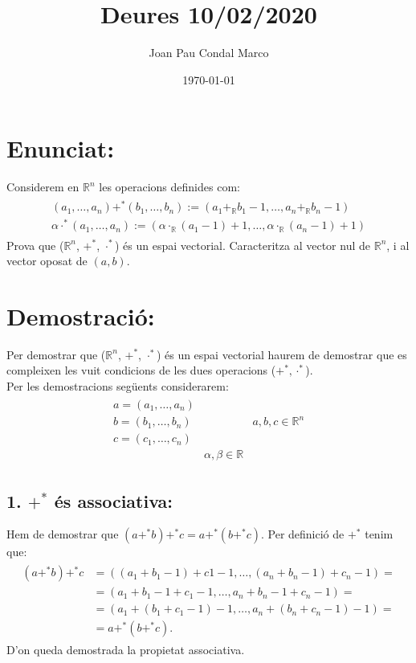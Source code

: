 \documentclass[a4paper, 9pt]{article}
\title{Deures 10/02/2020}
\author{Joan Pau Condal Marco}
\date{\today}
\begin{document}
    \maketitle
    \justify
    \section*{Enunciat:}

    Considerem en ${\mathbb{R}^n}$ les operacions definides com:
    \begin{align*}
        \begin{aligned}
            (a_1, \dots , a_n) +^* (b_1, \dots , b_n) := (a_1 +_{\mathbb{R}} b_1 - 1, \dots , a_n +_{\mathbb{R}} b_n -1) \\
            \alpha \cdot^* (a_1, \dots , a_n) := (\alpha \cdot_{\mathbb{R}} (a_1 -1)+1, \dots , \alpha \cdot_{\mathbb{R}} (a_n -1)+1)
        \end{aligned}
    \end{align*}
    Prova que (${\mathbb{R}}^n$, ${+^*}$, ${\cdot^*}$) \'es un espai vectorial. Caracteritza al vector nul de ${\mathbb{R}^n}$, i al vector oposat de ${(a,b)}$.  \\

    \section*{Demostraci\'o:}
    Per demostrar que (${\mathbb{R}}^n$, ${+^*}$, ${\cdot^*}$) \'es un espai vectorial haurem de demostrar que es compleixen les vuit condicions de les dues operacions (${+^*, \cdot^*}$).\\
    Per les demostracions seg\"uents considerarem:
    \begin{align*}
        \begin{array}{lcl}
            a = (a_1,\dots,a_n)& & \\
            b = (b_1,\dots,b_n)& & a, b, c \in \mathbb{R}^n\\
            c = (c_1,\dots,c_n)& &\\
            & \alpha,\beta \in \mathbb{R} &
        \end{array}
    \end{align*}
    
    \subsection*{1. ${+^*}$ \'es associativa:}
        Hem de demostrar que ${(a+^*b)+^*c = a+^*(b+^*c)}$. Per definici\'o de ${+^*}$ tenim que:
        \begin{align*}
            \begin{aligned}
                (a+^*b)+^*c &= ((a_1+b_1-1)+c1-1,\dots,(a_n+b_n-1)+c_n-1) =\\ 
                        &= (a_1+b_1-1+c_1-1,\dots,a_n+b_n-1+c_n-1) =\\ 
                        &= (a_1+(b_1+c_1-1)-1,\dots,a_n+(b_n+c_n-1)-1) =\\
                        &= a+^*(b+^*c).
            \end{aligned}
        \end{align*}
        D'on queda demostrada la propietat associativa.
\end{document}

